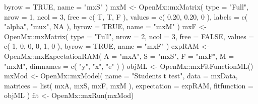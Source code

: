 \documentclass[
]{book}
\newenvironment{Shaded}{\begin{snugshade}}{\end{snugshade}}
\newcommand{\AttributeTok}[1]{\textcolor[rgb]{0.77,0.63,0.00}{#1}}
\newcommand{\ConstantTok}[1]{\textcolor[rgb]{0.00,0.00,0.00}{#1}}
\newcommand{\DecValTok}[1]{\textcolor[rgb]{0.00,0.00,0.81}{#1}}
\newcommand{\FloatTok}[1]{\textcolor[rgb]{0.00,0.00,0.81}{#1}}
\newcommand{\FunctionTok}[1]{\textcolor[rgb]{0.00,0.00,0.00}{#1}}
\newcommand{\NormalTok}[1]{#1}
\newcommand{\OtherTok}[1]{\textcolor[rgb]{0.56,0.35,0.01}{#1}}
\newcommand{\SpecialCharTok}[1]{\textcolor[rgb]{0.00,0.00,0.00}{#1}}
\newcommand{\StringTok}[1]{\textcolor[rgb]{0.31,0.60,0.02}{#1}}
\theoremstyle{definition}
\theoremstyle{definition}
\theoremstyle{definition}
\theoremstyle{remark}
\begin{document}
\begin{Shaded}
\begin{Highlighting}[]
  \AttributeTok{byrow =} \ConstantTok{TRUE}\NormalTok{,}
  \AttributeTok{name =} \StringTok{"mxS"}
\NormalTok{)}
\NormalTok{mxM }\OtherTok{\textless{}{-}}\NormalTok{ OpenMx}\SpecialCharTok{::}\FunctionTok{mxMatrix}\NormalTok{(}
  \AttributeTok{type =} \StringTok{"Full"}\NormalTok{,}
  \AttributeTok{nrow =} \DecValTok{1}\NormalTok{,}
  \AttributeTok{ncol =} \DecValTok{3}\NormalTok{,}
  \AttributeTok{free =} \FunctionTok{c}\NormalTok{(}
\NormalTok{    T, T, F}
\NormalTok{  ),}
  \AttributeTok{values =} \FunctionTok{c}\NormalTok{(}
    \FloatTok{0.20}\NormalTok{,}
    \FloatTok{0.20}\NormalTok{,}
    \DecValTok{0}
\NormalTok{  ),}
  \AttributeTok{labels =} \FunctionTok{c}\NormalTok{(}
    \StringTok{"alpha"}\NormalTok{,}
    \StringTok{"mux"}\NormalTok{,}
    \ConstantTok{NA}
\NormalTok{  ),}
  \AttributeTok{byrow =} \ConstantTok{TRUE}\NormalTok{,}
  \AttributeTok{name =} \StringTok{"mxM"}
\NormalTok{)}
\NormalTok{mxF }\OtherTok{\textless{}{-}}\NormalTok{ OpenMx}\SpecialCharTok{::}\FunctionTok{mxMatrix}\NormalTok{(}
  \AttributeTok{type =} \StringTok{"Full"}\NormalTok{,}
  \AttributeTok{nrow =} \DecValTok{2}\NormalTok{,}
  \AttributeTok{ncol =} \DecValTok{3}\NormalTok{,}
  \AttributeTok{free =} \ConstantTok{FALSE}\NormalTok{,}
  \AttributeTok{values =} \FunctionTok{c}\NormalTok{(}
    \DecValTok{1}\NormalTok{, }\DecValTok{0}\NormalTok{, }\DecValTok{0}\NormalTok{,}
    \DecValTok{0}\NormalTok{, }\DecValTok{1}\NormalTok{, }\DecValTok{0}
\NormalTok{  ),}
  \AttributeTok{byrow =} \ConstantTok{TRUE}\NormalTok{,}
  \AttributeTok{name =} \StringTok{"mxF"}
\NormalTok{)}
\NormalTok{expRAM }\OtherTok{\textless{}{-}}\NormalTok{ OpenMx}\SpecialCharTok{::}\FunctionTok{mxExpectationRAM}\NormalTok{(}
  \AttributeTok{A =} \StringTok{"mxA"}\NormalTok{,}
  \AttributeTok{S =} \StringTok{"mxS"}\NormalTok{,}
  \AttributeTok{F =} \StringTok{"mxF"}\NormalTok{,}
  \AttributeTok{M =} \StringTok{"mxM"}\NormalTok{,}
  \AttributeTok{dimnames =} \FunctionTok{c}\NormalTok{(}
    \StringTok{"y"}\NormalTok{,}
    \StringTok{"x"}\NormalTok{,}
    \StringTok{"e"}
\NormalTok{  )}
\NormalTok{)}
\NormalTok{objML }\OtherTok{\textless{}{-}}\NormalTok{ OpenMx}\SpecialCharTok{::}\FunctionTok{mxFitFunctionML}\NormalTok{()}
\NormalTok{mxMod }\OtherTok{\textless{}{-}}\NormalTok{ OpenMx}\SpecialCharTok{::}\FunctionTok{mxModel}\NormalTok{(}
  \AttributeTok{name =} \StringTok{"Student\textquotesingle{}s t test"}\NormalTok{,}
  \AttributeTok{data =}\NormalTok{ mxData,}
  \AttributeTok{matrices =} \FunctionTok{list}\NormalTok{(}
\NormalTok{    mxA,}
\NormalTok{    mxS,}
\NormalTok{    mxF,}
\NormalTok{    mxM}
\NormalTok{  ),}
  \AttributeTok{expectation =}\NormalTok{ expRAM,}
  \AttributeTok{fitfunction =}\NormalTok{ objML}
\NormalTok{)}
\NormalTok{fit }\OtherTok{\textless{}{-}}\NormalTok{ OpenMx}\SpecialCharTok{::}\FunctionTok{mxRun}\NormalTok{(mxMod)}
\end{Highlighting}
\end{Shaded}
\end{document}
